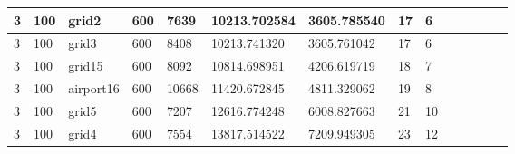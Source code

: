 \documentclass[../thesis.tex]{subfiles}
\begin{document}
\begin{table}[!ht]
\begin{tabularx}{\textwidth}{|X|X|X|X|X|X|X|X|X|X|X|X|X|X|}
        3 & 100 & grid2 & 600 & 7639 & 10213.702584 & 3605.785540 & 17 & 6 \\ \hline
        3 & 100 & grid3 & 600 & 8408 & 10213.741320 & 3605.761042 & 17 & 6 \\ \hline
        3 & 100 & grid15 & 600 & 8092 & 10814.698951 & 4206.619719 & 18 & 7 \\ \hline
        3 & 100 & airport16 & 600 & 10668 & 11420.672845 & 4811.329062 & 19 & 8 \\ \hline
        3 & 100 & grid5 & 600 & 7207 & 12616.774248 & 6008.827663 & 21 & 10 \\ \hline
        3 & 100 & grid4 & 600 & 7554 & 13817.514522 & 7209.949305 & 23 & 12 \\ \hline
    \end{tabularx}
\end{table}
\end{document}
